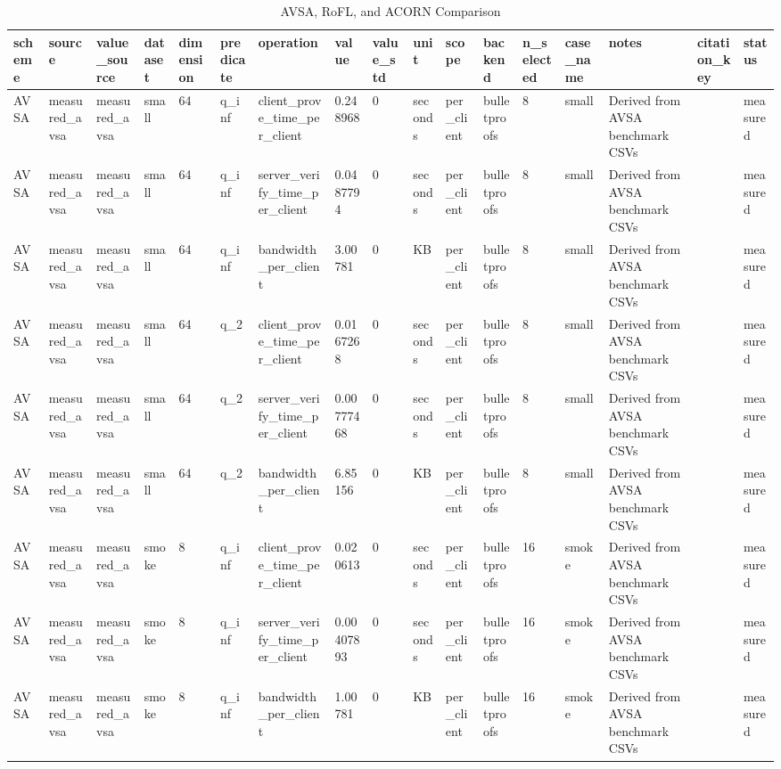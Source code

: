 \begin{table}[t]
\centering
\small
\caption{AVSA, RoFL, and ACORN Comparison}
\begin{tabular}{lllllllllllllllll}
\toprule
scheme & source & value\_source & dataset & dimension & predicate & operation & value & value\_std & unit & scope & backend & n\_selected & case\_name & notes & citation\_key & status \\
\midrule
AVSA & measured\_avsa & measured\_avsa & small & 64 & q\_inf & client\_prove\_time\_per\_client & 0.248968 & 0 & seconds & per\_client & bulletproofs & 8 & small & Derived from AVSA benchmark CSVs &  & measured \\
AVSA & measured\_avsa & measured\_avsa & small & 64 & q\_inf & server\_verify\_time\_per\_client & 0.0487794 & 0 & seconds & per\_client & bulletproofs & 8 & small & Derived from AVSA benchmark CSVs &  & measured \\
AVSA & measured\_avsa & measured\_avsa & small & 64 & q\_inf & bandwidth\_per\_client & 3.00781 & 0 & KB & per\_client & bulletproofs & 8 & small & Derived from AVSA benchmark CSVs &  & measured \\
AVSA & measured\_avsa & measured\_avsa & small & 64 & q\_2 & client\_prove\_time\_per\_client & 0.0167268 & 0 & seconds & per\_client & bulletproofs & 8 & small & Derived from AVSA benchmark CSVs &  & measured \\
AVSA & measured\_avsa & measured\_avsa & small & 64 & q\_2 & server\_verify\_time\_per\_client & 0.00777468 & 0 & seconds & per\_client & bulletproofs & 8 & small & Derived from AVSA benchmark CSVs &  & measured \\
AVSA & measured\_avsa & measured\_avsa & small & 64 & q\_2 & bandwidth\_per\_client & 6.85156 & 0 & KB & per\_client & bulletproofs & 8 & small & Derived from AVSA benchmark CSVs &  & measured \\
AVSA & measured\_avsa & measured\_avsa & smoke & 8 & q\_inf & client\_prove\_time\_per\_client & 0.020613 & 0 & seconds & per\_client & bulletproofs & 16 & smoke & Derived from AVSA benchmark CSVs &  & measured \\
AVSA & measured\_avsa & measured\_avsa & smoke & 8 & q\_inf & server\_verify\_time\_per\_client & 0.00407893 & 0 & seconds & per\_client & bulletproofs & 16 & smoke & Derived from AVSA benchmark CSVs &  & measured \\
AVSA & measured\_avsa & measured\_avsa & smoke & 8 & q\_inf & bandwidth\_per\_client & 1.00781 & 0 & KB & per\_client & bulletproofs & 16 & smoke & Derived from AVSA benchmark CSVs &  & measured \\

\end{tabular}
\end{table}
